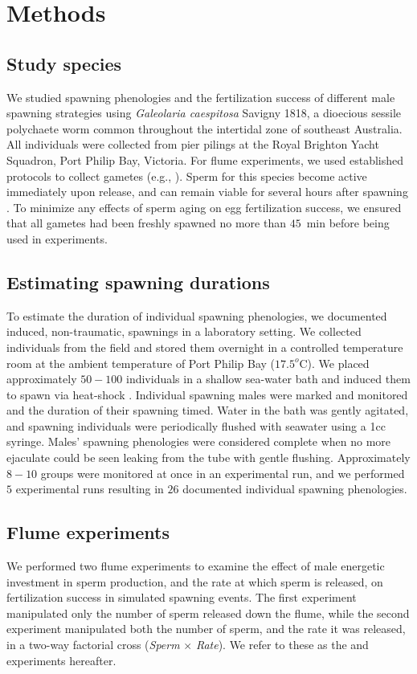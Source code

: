 \documentclass{article}
\begin{document}
\section{Methods} 
	\label{sec:methods}

	\subsection*{Study species}
	We studied spawning phenologies and the fertilization success of different male spawning strategies using \textit{Galeolaria caespitosa} Savigny 1818, a dioecious sessile polychaete worm common throughout the intertidal zone of southeast Australia. All individuals were collected from pier pilings at the Royal Brighton Yacht Squadron, Port Philip Bay, Victoria. For flume experiments, we used established protocols to collect gametes (e.g., \citealt{MarshallEvans2005a, MarshallEvans2005b}). Sperm for this species become active immediately upon release, and can remain viable for several hours after spawning \citep{Kupriyanova2013}. To minimize any effects of sperm aging on egg fertilization success, we ensured that all gametes had been freshly spawned no more than $45$~min before being used in experiments.

	\subsection*{Estimating spawning durations}
	To estimate the duration of individual spawning phenologies, we documented induced, non-traumatic, spawnings in a laboratory setting. We collected individuals from the field and stored them overnight in a controlled temperature room at the ambient temperature of Port Philip Bay ($17.5^o$C). We placed approximately $50-100$ individuals in a shallow sea-water bath and induced them to spawn via heat-shock \citep{Strathmann1987}. Individual spawning males were marked and monitored and the duration of their spawning timed. Water in the bath was gently agitated, and spawning individuals were periodically flushed with seawater using a 1cc syringe. Males' spawning phenologies were considered complete when no more ejaculate could be seen leaking from the tube with gentle flushing. Approximately $8-10$ groups were monitored at once in an experimental run, and we performed $5$ experimental runs resulting in $26$ documented individual spawning phenologies. 

	\subsection*{Flume experiments}
	We performed two flume experiments to examine the effect of male energetic investment in sperm production, and the rate at which sperm is released, on fertilization success in simulated spawning events. The first experiment manipulated only the number of sperm released down the flume, while the second experiment manipulated both the number of sperm, and the rate it was released, in a two-way factorial cross (\textit{Sperm} $\times$ \textit{Rate}). We refer to these as the  and  experiments hereafter. 
\end{document}
